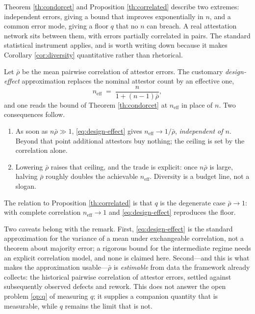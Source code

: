 \begin{remark}\label{rmk:design-effect}
Theorem \ref{th:condorcet} and Proposition \ref{th:correlated} describe two extremes: independent
errors, giving a bound that improves exponentially in $n$, and a common error mode, giving a floor
$q$ that no $n$ can breach. A real attestation network sits between them, with errors partially
correlated in pairs. The standard statistical instrument applies, and is worth writing down because
it makes Corollary \ref{cor:diversity} quantitative rather than rhetorical.

Let $\bar\rho$ be the mean pairwise correlation of attestor errors. The customary
\emph{design-effect} approximation \cite{kish1965} replaces the nominal attestor count by an
effective one,
\begin{equation}\label{eq:design-effect}
n_{\mathrm{eff}} \;=\; \frac{n}{1 + (n-1)\bar\rho},
\end{equation}
and one reads the bound of Theorem \ref{th:condorcet} at $n_{\mathrm{eff}}$ in place of $n$. Two
consequences follow.
\begin{enumerate}[label=(\alph*)]
\item As soon as $n\bar\rho \gg 1$, \eqref{eq:design-effect} gives
      $n_{\mathrm{eff}} \to 1/\bar\rho$, \emph{independent of $n$}. Beyond that point additional
      attestors buy nothing; the ceiling is set by the correlation alone.
\item Lowering $\bar\rho$ raises that ceiling, and the trade is explicit: once $n\bar\rho$ is large,
      halving $\bar\rho$ roughly doubles the achievable $n_{\mathrm{eff}}$. Diversity is a budget
      line, not a slogan.
\end{enumerate}
The relation to Proposition \ref{th:correlated} is that $q$ is the degenerate case
$\bar\rho \to 1$: with complete correlation $n_{\mathrm{eff}} \to 1$ and \eqref{eq:design-effect}
reproduces the floor.

Two caveats belong with the remark. First, \eqref{eq:design-effect} is the standard approximation
for the variance of a mean under exchangeable correlation, not a theorem about majority error; a
rigorous bound for the intermediate regime needs an explicit correlation model, and none is claimed
here. Second---and this is what makes the approximation usable---$\bar\rho$ is \emph{estimable} from
data the framework already collects: the historical pairwise correlation of attestor errors, settled
against subsequently observed defects and rework. This does not answer the open problem
\ref{op:q} of measuring $q$; it supplies a companion quantity that is measurable, while $q$ remains
the limit that is not.
\end{remark}

